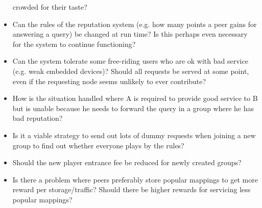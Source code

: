 \documentclass[10pt]{article}
\begin{document}
\begin{itemize}
      crowded for their taste?
\item Can the rules of the reputation system (e.g. how many points a peer gains
      for answering a query) be changed at run time? Is this perhaps even
      necessary for the system to continue functioning?
\item Can the system tolerate some free-riding users who are ok with bad service
      (e.g. weak embedded devices)? Should all requests be served at some point,
      even if the requesting node seems unlikely to ever contribute?
\item How is the situation handled where A is required to provide good service
      to B but is unable because he needs to forward the query in a group where
      he has bad reputation?
\item Is it a viable strategy to send out lots of dummy requests when joining a
      new group to find out whether everyone plays by the rules?
\item Should the new player entrance fee be reduced for newly created groups?
\item Is there a problem where peers preferably store popular mappings to get
      more reward per storage/traffic? Should there be higher rewards for
      servicing less popular mappings?
\end{itemize}

{}

\end{document}
